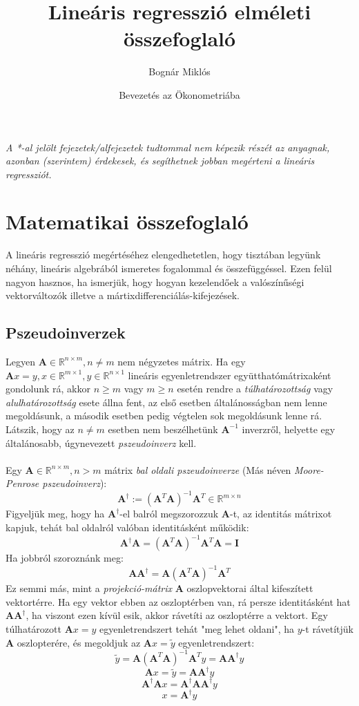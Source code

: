\documentclass[14p]{report}
\title{Lineáris regresszió elméleti összefoglaló}
\author{Bognár Miklós}
\date{Bevezetés az Ökonometriába}
\def\pmb{\boldsymbol}
\begin{document}
	\maketitle
	\tableofcontents
	\vspace{2cm}
	\emph{A *-al jelölt fejezetek/alfejezetek tudtommal nem képezik részét az anyagnak, azonban (szerintem) érdekesek, és segíthetnek jobban megérteni a lineáris regressziót.}
	\newpage
	\chapter{Matematikai összefoglaló}
	A lineáris regresszió megértéséhez elengedhetetlen, hogy tisztában legyünk néhány, lineáris algebrából ismeretes fogalommal és összefüggéssel. Ezen felül nagyon hasznos, ha ismerjük, hogy hogyan kezelendőek a valószínűségi vektorváltozók illetve a mártixdifferenciálás-kifejezések.  
	
	\section{Pszeudoinverzek}
	Legyen $\pmb{A} \in \mathbb{R}^{n\times m}, n \ne m$ nem négyzetes mátrix. Ha egy  $\pmb{A}x = y , x \in \mathbb{R}^{m\times 1}, y \in \mathbb{R}^{n \times 1}$ lineáris egyenletrendszer együtthatómátrixaként gondolunk rá, akkor $n \ge m$ vagy $m \ge n$ esetén rendre a \emph{túlhatározottság} vagy \emph{alulhatározottság} esete állna fent, az első esetben általánosságban nem lenne megoldásunk, a második esetben pedig végtelen sok megoldásunk lenne rá. Látszik, hogy az $n \ne m$ esetben nem beszélhetünk $\pmb{A}^{-1}$ inverzről, helyette egy általánosabb, úgynevezett \emph{pszeudoinverz} kell.
	\\
	\\
	Egy $\pmb{A} \in \mathbb{R}^{n \times m}, n > m$ mátrix \emph{bal oldali pszeudoinverze} (Más néven \emph{Moore-Penrose pszeudoinverz}):
	\[
	\pmb{A}^{\dagger} := (\pmb{A}^T\pmb{A})^{-1}\pmb{A}^T \in \mathbb{R}^{m \times n}
	\]
	Figyeljük meg, hogy ha $\pmb{A}^{\dagger}$-el balról megszorozzuk $\pmb{A}$-t, az identitás mátrixot kapjuk, tehát bal oldalról valóban identitásként működik:
	\[
	\pmb{A}^{\dagger}\pmb{A} = (\pmb{A}^T\pmb{A})^{-1}\pmb{A}^T\pmb{A} = \pmb{I}
	\]
	Ha jobbról szoroznánk meg:
	\[
	\pmb{A}\pmb{A}^{\dagger} = \pmb{A}(\pmb{A}^T\pmb{A})^{-1}\pmb{A}^T
	\]
	Ez semmi más, mint a \emph{projekció-mátrix} $\pmb{A}$ oszlopvektorai által kifeszített vektortérre. Ha egy vektor ebben az oszloptérben van, rá persze identitásként hat $\pmb{A}\pmb{A}^{\dagger}$, ha viszont ezen kívül esik, akkor rávetíti az oszloptérre a vektort. Egy túlhatározott $\pmb{A}x = y$ egyenletrendszert tehát "meg lehet oldani", ha $y$-t rávetítjük $\pmb{A}$ oszlopterére, és megoldjuk az $\pmb{A}x = \tilde{y}$ egyenletrendszert: 
	\[
	\tilde{y} = \pmb{A}(\pmb{A}^T\pmb{A})^{-1}\pmb{A}^T y = \pmb{A}\pmb{A}^{\dagger} y
	\]
	\[
	\pmb{A}x = \tilde{y} = \pmb{A}\pmb{A}^{\dagger}y
	\]
	\[
	\pmb{A}^{\dagger}\pmb{A}x = \pmb{A}^{\dagger}\pmb{A}\pmb{A}^{\dagger}y
	\]
	\[
	x  = \pmb{A}^{\dagger}y
	\]
	
\end{document}
